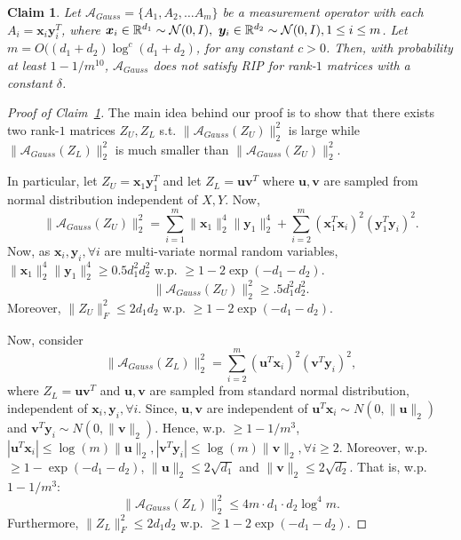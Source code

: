 \documentclass[11pt]{article}
\newtheorem{claim}[lemma]{Claim}
\newcommand{\calN}{{\cal N}}
\newcommand{\R}{\mathbb{R}}
\newcommand{\calA}{\mathcal{A}}
\renewcommand{\u}{\bm{u}}
\renewcommand{\v}{\bm{v}}
\newcommand{\x}{\bm{x}}
\newcommand{\y}{\bm{y}}
\begin{document}
\begin{claim}\label{claim:notrip}
  Let $\calA_{Gauss}=\{A_1, A_2, \dots A_m\}$ be a measurement operator with each $A_i=\x_i\y_i^T$, where %
$\x_i \in \R^{d_1}\sim \calN(0, I),\ \y_i \in \R^{d_2}\sim \calN(0, I), 1\leq i\leq m$. Let $m=O((d_1+d_2)\log^c(d_1+d_2)$, for any constant $c>0$. Then, with probability at least $1-1/m^{10}$, $\calA_{Gauss}$ does not satisfy RIP for rank-$1$ matrices with a constant $\delta$. %
\end{claim}
\begin{proof}[Proof of Claim~\ref{claim:notrip}]
The main idea behind our proof is to show that there exists two rank-$1$ matrices $Z_U, Z_L$ s.t. $\|\mathcal{A}_{Gauss}(Z_U)\|_2^2$ is large  while $\|\mathcal{A}_{Gauss}(Z_L)\|_2^2$ is much smaller than $\|\mathcal{A}_{Gauss}(Z_U)\|_2^2$. 

In particular, let $Z_U=\x_1 \y_1^T$ and let $Z_L=\u \v^T$ where $\u, \v$ are sampled from normal distribution independent of $X, Y$. 
Now, $$\|\mathcal{A}_{Gauss}(Z_U)\|_2^2=\sum_{i=1}^m \|\x_1\|_2^4\|\y_1\|_2^4+\sum_{i=2}^m (\x_1^T\x_i)^2(\y_1^T\y_i)^2.$$
Now, as  $\x_i, \y_i, \forall i$ are multi-variate normal random variables, $\|\x_1\|_2^4\|\y_1\|_2^4\geq 0.5 d_1^2d_2^2$ w.p. $\geq 1-2\exp(-d_1-d_2)$. 
\begin{equation}\|\mathcal{A}_{Gauss}(Z_U)\|_2^2\geq .5 d_1^2 d_2^2.\label{eq:nrlb}\end{equation}
Moreover, $\|Z_U\|_F^2\leq 2d_1d_2$ w.p. $\geq 1-2\exp(-d_1-d_2)$.

Now, consider $$\|\mathcal{A}_{Gauss}(Z_L)\|_2^2=\sum_{i=2}^m (\u^T\x_i)^2(\v^T\y_i)^2,$$
where $Z_L=\u\v^T$ and $\u, \v$ are sampled from standard normal distribution, independent of $\x_i, \y_i, \forall i$. Since, $\u, \v$ are independent of $\u^T\x_i \sim N(0, \|\u\|_2)$ and $\v^T\y_i\sim N(0, \|\v\|_2)$. Hence, w.p. $\geq 1-1/m^{3}$, $|\u^T\x_i| \leq \log(m)\|\u\|_2, |\v^T\y_i| \leq \log(m)\|\v\|_2, \forall i\geq 2$.  Moreover, w.p. $\geq 1-\exp(-d_1-d_2)$, $\|\u\|_2\leq 2 \sqrt{d_1}$ and $\|\v\|_2\leq 2 \sqrt{d_2}$. 
That is, w.p. $1-1/m^3$: \begin{equation}\label{eq:nrub}\|\mathcal{A}_{Gauss}(Z_L)\|_2^2\leq 4m\cdot d_1\cdot d_2 \log^4m .\end{equation}
Furthermore, $\|Z_L\|_F^2\leq 2d_1d_2$ w.p.  $\geq 1-2\exp(-d_1-d_2)$. 


\end{proof}
\end{document}
